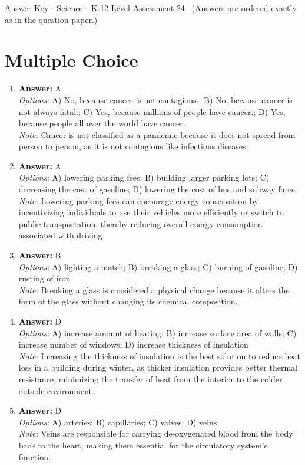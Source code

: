 \documentclass[12pt]{article}
\begin{document}
\begin{center}
Answer Key - Science - K-12 Level Assessment 24 \
\small (Answers are ordered exactly as in the question paper.)
\end{center}

\section*{Multiple Choice}
\begin{enumerate}[label=\arabic*.]
\item \textbf{Answer:} A
\\ \textit{Options:} A) No, because cancer is not contagious.; B) No, because cancer is not always fatal.; C) Yes, because millions of people have cancer.; D) Yes, because people all over the world have cancer.
\\ \textit{Note:} Cancer is not classified as a pandemic because it does not spread from person to person, as it is not contagious like infectious diseases.
\item \textbf{Answer:} A
\\ \textit{Options:} A) lowering parking fees; B) building larger parking lots; C) decreasing the cost of gasoline; D) lowering the cost of bus and subway fares
\\ \textit{Note:} Lowering parking fees can encourage energy conservation by incentivizing individuals to use their vehicles more efficiently or switch to public transportation, thereby reducing overall energy consumption associated with driving.
\item \textbf{Answer:} B
\\ \textit{Options:} A) lighting a match; B) breaking a glass; C) burning of gasoline; D) rusting of iron
\\ \textit{Note:} Breaking a glass is considered a physical change because it alters the form of the glass without changing its chemical composition.
\item \textbf{Answer:} D
\\ \textit{Options:} A) increase amount of heating; B) increase surface area of walls; C) increase number of windows; D) increase thickness of insulation
\\ \textit{Note:} Increasing the thickness of insulation is the best solution to reduce heat loss in a building during winter, as thicker insulation provides better thermal resistance, minimizing the transfer of heat from the interior to the colder outside environment.
\item \textbf{Answer:} D
\\ \textit{Options:} A) arteries; B) capillaries; C) valves; D) veins
\\ \textit{Note:} Veins are responsible for carrying de-oxygenated blood from the body back to the heart, making them essential for the circulatory system's function.
\end{enumerate}
\end{document}

